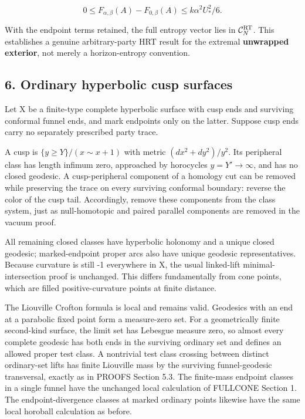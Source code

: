 \documentclass[11pt]{article}
\begin{document}
\[
0\le F_{\alpha,\beta}(A)-F_{0,\beta}(A)
\le k\alpha^2U_*^2/6.
\]

With the endpoint terms retained, the full entropy vector lies in
\(\mathcal C_N^{\rm RT}\). This establishes a genuine arbitrary-party
HRT result for the extremal \textbf{unwrapped exterior}, not merely a
horizon-entropy convention.

\subsection{6. Ordinary hyperbolic cusp
surfaces}\label{ordinary-hyperbolic-cusp-surfaces}

Let X be a finite-type complete hyperbolic surface with cusp ends and
surviving conformal funnel ends, and mark endpoints only on the latter.
Suppose cusp ends carry no separately prescribed party trace.

A cusp is \(\{y\ge Y\}/(x\sim x+1)\) with metric \((dx^2+dy^2)/y^2\).
Its peripheral class has length infimum zero, approached by horocycles
\(y=Y'\to\infty\), and has no closed geodesic. A cusp-peripheral
component of a homology cut can be removed while preserving the trace on
every surviving conformal boundary: reverse the color of the cusp tail.
Accordingly, remove these components from the class system, just as
null-homotopic and paired parallel components are removed in the vacuum
proof.

All remaining closed classes have hyperbolic holonomy and a unique
closed geodesic; marked-endpoint proper arcs also have unique geodesic
representatives. Because curvature is still -1 everywhere in X, the
usual linked-lift minimal-intersection proof is unchanged. This differs
fundamentally from cone points, which are filled positive-curvature
points at finite distance.

The Liouville Crofton formula is local and remains valid. Geodesics with
an end at a parabolic fixed point form a measure-zero set. For a
geometrically finite second-kind surface, the limit set has Lebesgue
measure zero, so almost every complete geodesic has both ends in the
surviving ordinary set and defines an allowed proper test class. A
nontrivial test class crossing between distinct ordinary-set lifts has
finite Liouville mass by the surviving funnel-geodesic transversal,
exactly as in PROOFS Section 5.3. The finite-mass endpoint classes in a
single funnel have the unchanged local calculation of FULLCONE Section
1. The endpoint-divergence classes at marked ordinary points likewise
have the same local horoball calculation as before.
\end{document}
